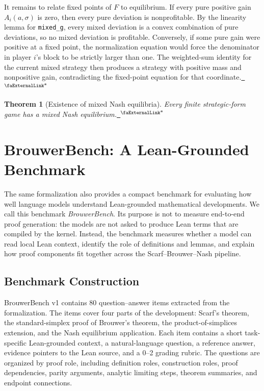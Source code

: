 \documentclass{article}
\newtheorem{theorem}{Theorem}[section]
\theoremstyle{definition}
\newcommand{\extlink}{~\ensuremath{{}^\text{\faExternalLink*}}}
\begin{document}
It remains to relate fixed points of $F$ to equilibrium.  If every pure positive gain $A_i(a,\sigma)$ is zero, then every pure deviation is nonprofitable.  By the linearity lemma for \texttt{mixed\_g}, every mixed deviation is a convex combination of pure deviations, so no mixed deviation is profitable.  Conversely, if some pure gain were positive at a fixed point, the normalization equation would force the denominator in player $i$'s block to be strictly larger than one.  The weighted-sum identity for the current mixed strategy then produces a strategy with positive mass and nonpositive gain, contradicting the fixed-point equation for that coordinate.\href{https://github.com/Solo-ary/Game-Theory-Formalization/blob/7b49d5267d4f26b17bdf071250880b63e96999b6/Brouwer/Gametheory/Nash.lean#L477-L581}{\extlink}

\begin{theorem}[Existence of mixed Nash equilibria]
Every finite strategic-form game has a mixed Nash equilibrium.\href{https://github.com/Solo-ary/Game-Theory-Formalization/blob/7b49d5267d4f26b17bdf071250880b63e96999b6/Brouwer/Gametheory/Nash.lean#L477-L581}{\extlink}
\end{theorem}


\section{BrouwerBench: A Lean-Grounded Benchmark}
\label{sec:benchmark}

The same formalization also provides a compact benchmark for evaluating how well language models understand Lean-grounded mathematical developments. We call this benchmark \emph{BrouwerBench}. Its purpose is not to measure end-to-end proof generation: the models are not asked to produce Lean terms that are compiled by the kernel. Instead, the benchmark measures whether a model can read local Lean context, identify the role of definitions and lemmas, and explain how proof components fit together across the Scarf--Brouwer--Nash pipeline.

\subsection{Benchmark Construction}

BrouwerBench v1 contains 80 question--answer items extracted from the formalization. The items cover four parts of the development: Scarf's theorem, the standard-simplex proof of Brouwer's theorem, the product-of-simplices extension, and the Nash equilibrium application. Each item contains a short task-specific Lean-grounded context, a natural-language question, a reference answer, evidence pointers to the Lean source, and a 0--2 grading rubric. The questions are organized by proof role, including definition roles, construction roles, proof dependencies, parity arguments, analytic limiting steps, theorem summaries, and endpoint connections.
\end{document}
